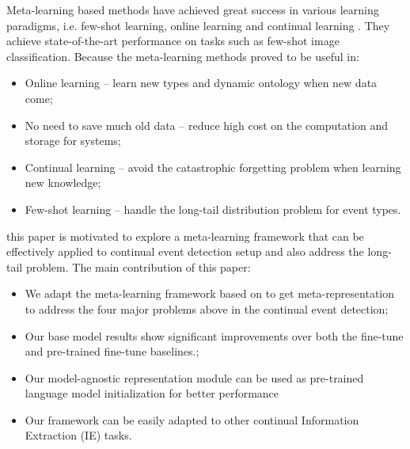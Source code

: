 Meta-learning based methods have achieved great success in various learning paradigms, i.e. few-shot learning, online learning and continual learning \citep{harrison2019continuous, javed2019meta}. They achieve state-of-the-art performance on tasks such as few-shot image classification. Because the meta-learning methods proved to be useful in: 
\begin{itemize}[noitemsep]
  \item Online learning -- learn new types and dynamic ontology when new data come;
  \item No need to save much old data -- reduce high cost on the computation and storage for systems;
  \item Continual learning -- avoid the catastrophic forgetting problem when learning new knowledge;
  \item Few-shot learning -- handle the long-tail distribution problem for event types.
\end{itemize}
this paper is motivated to explore a meta-learning framework that can be effectively applied to continual event detection setup and also address the long-tail problem. The main contribution of this paper: 
\begin{itemize}[noitemsep]
  \item We adapt the meta-learning framework based on \citet{javed2019meta} to get meta-representation to address the four major problems above in the continual event detection;
  \item Our base model results show significant improvements over both the fine-tune and pre-trained fine-tune baselines.;
  \item Our model-agnostic representation module can be used as pre-trained language model initialization for better performance
  \item Our framework can be easily adapted to other continual Information Extraction (IE) tasks.
\end{itemize}